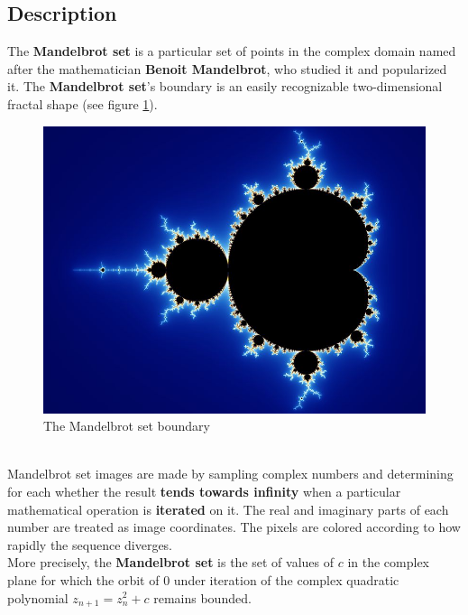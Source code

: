 \documentclass[a4paper,11pt]{article}
\begin{document}
\subsection{Description}
The \textbf{Mandelbrot set} is a particular set of points in the complex domain named after the mathematician
    \textbf{Benoit Mandelbrot}, who studied it and popularized it. The \textbf{Mandelbrot set}'s boundary is an easily
    recognizable two-dimensional fractal shape (see figure \ref{mandelbrot:boundary}).
\begin{figure}[h!]
\includegraphics[width=1.0\textwidth]{figures/mandelbrot_boundary.jpg}
\caption{The Mandelbrot set boundary}
\label{mandelbrot:boundary}
\end{figure}
\\
Mandelbrot set images are made by sampling complex numbers and determining for each whether the result
    \textbf{tends towards infinity} when a particular mathematical operation is \textbf{iterated} on it. The real
    and imaginary parts of each number are treated as image coordinates. The pixels are colored according to how rapidly
    the sequence diverges.
\\
More precisely, the \textbf{Mandelbrot set} is the set of values of $c$ in the complex plane for which the orbit of
    $0$ under iteration of the complex quadratic polynomial $z_{n+1} = z^2_n + c$ remains bounded.
\end{document}
